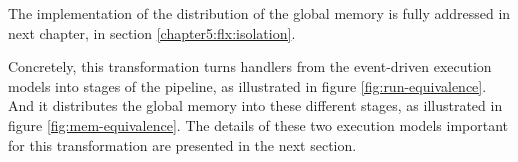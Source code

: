 The implementation of the distribution of the global memory is fully addressed in next chapter, in section \ref{chapter5:flx:isolation}.

















Concretely, this transformation turns handlers from the event-driven execution models into stages of the pipeline, as illustrated in figure \ref{fig:run-equivalence}.
And it distributes the global memory  into these different stages, as illustrated in figure \ref{fig:mem-equivalence}.
The details of these two execution models important for this transformation are presented in the next section.

